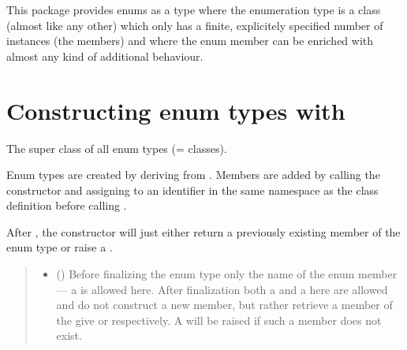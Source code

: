 \documentclass[letterpaper,10pt,english]{sphinxmanual}
\begin{document}
\sphinxAtStartPar
This package provides enums as a type where the enumeration type is a
class (almost like any other) which only has a finite, explicitely
specified number of instances (the members) and where the enum member
can be enriched with almost any kind of additional behaviour.


\section{Constructing enum types with }
\label{\detokenize{enums:constructing-enum-types-with-enum}}

\begin{fulllineitems}
\label{\detokenize{enums:greenland.base.enums.Enum}}
\pysigstartsignatures
{}
\pysigstopsignatures
\sphinxAtStartPar
The super class of all enum types (= classes).

\sphinxAtStartPar
Enum types are created by deriving from {\hyperref[\detokenize{enums:greenland.base.enums.Enum}]{}}. Members
are added by calling the constructor and assigning to an
identifier in the same namespace as the class definition before
calling .

\sphinxAtStartPar
After , the constructor will just either
return a previously existing member of the enum type or raise a
.
\begin{quote}\begin{description}
\begin{itemize}
\item {} 
\sphinxAtStartPar
{} (\sphinxstyleliteralemphasis{\sphinxupquote{ | }}) \textendash{} Before finalizing the enum type only the name of
the enum member — a  \textendash{} is allowed here. After
finalization both a  and a  here are allowed and
do not construct a new member, but rather retrieve a member of
the give  or  respectively. A
 will be raised if such a member does
not exist.


\end{itemize}
\end{description}
\end{quote}
\end{fulllineitems}
\end{document}
